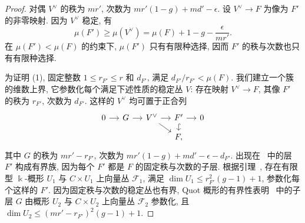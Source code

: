 \begin{proof}
对偶 $V^\vee$ 的秩为 $mr'$, 次数为 $mr'(1-g)+md'-\epsilon$. 设 $V^\vee\to F$ 为像为 $F'$ 的非零映射. 因为 $V^\vee$ 稳定, 有
\[
\mu(F')\geq\mu(V^\vee)=\mu(F)+1-g-\frac{\epsilon}{mr'}.
\]
在 $\mu(F')<\mu(F)$ 的约束下, $\mu(F')$ 只有有限种选择, 因而 $F'$ 的秩与次数也只有有限种选择.

为证明 (1), 固定整数 $1\leq r_{F'}\leq r$ 和 $d_{F'}$, 满足 $d_{F'}/r_{F'}<\mu(F)$. 我们建立一个簇的维数上界, 它参数化每个满足下述性质的稳定丛 $V$: 存在映射 $V^\vee\to F$, 其像 $F'$ 的秩为 $r_{F'}$, 次数为 $d_{F'}$. 这样的 $V^\vee$ 均可置于正合列
\begin{equation}\label{src:9.6.2}
\begin{tikzcd}[ampersand replacement=\&,column sep=small,row sep=small]
0\arrow[r]\&G\arrow[r]\&V^\vee\arrow[r]\arrow[dr]\&F'\arrow[r]\arrow[d,hook]\&0\\
\&\&\&F,\&
\end{tikzcd}
\end{equation}
其中 $G$ 的秩为 $mr'-r_{F'}$, 次数为 $mr'(1-g)+md'-\epsilon-d_{F'}$. 出现在~ 中的层 $F'$ 构成有界族, 因为每个 $F'$ 都是 $F$ 的固定秩与次数的子层. 根据引理~, 存在有限型 $\Bbbk$-概形 $U_1$ 与 $C\times U_1$ 上向量丛 $\mathcal F_1$, 满足 $\dim U_1\leq r_{F'}^2(g-1)+1$, 参数化每个这样的 $F'$. 因为固定秩与次数的稳定丛也有界, Quot 概形的有界性表明~ 中的子层 $G$ 由概形 $U_2$ 与 $C\times U_2$ 上向量丛 $\mathcal F_2$ 参数化, 且 $\dim U_2\leq(mr'-r_{F'})^2(g-1)+1$.


\end{proof}
